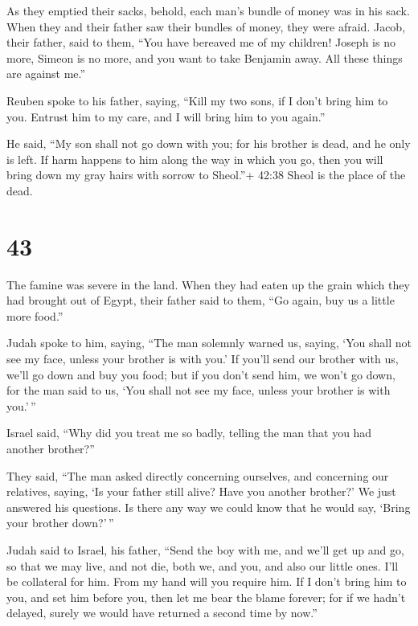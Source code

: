  As they emptied their sacks, behold, each man's bundle of
money was in his sack. When they and their father saw their bundles of
money, they were afraid.  Jacob, their father, said to
them, ``You have bereaved me of my children! Joseph is no more, Simeon
is no more, and you want to take Benjamin away. All these things are
against me.''

 Reuben spoke to his father, saying, ``Kill my two sons, if
I don't bring him to you. Entrust him to my care, and I will bring him
to you again.''

 He said, ``My son shall not go down with you; for his
brother is dead, and he only is left. If harm happens to him along the
way in which you go, then you will bring down my gray hairs with sorrow
to Sheol.''+ 42:38 Sheol is the place of the dead.

\hypertarget{section-42}{%
\section{43}\label{section-42}}

 The famine was severe in the land.  When they
had eaten up the grain which they had brought out of Egypt, their father
said to them, ``Go again, buy us a little more food.''

 Judah spoke to him, saying, ``The man solemnly warned us,
saying, `You shall not see my face, unless your brother is with you.'
 If you'll send our brother with us, we'll go down and buy
you food;  but if you don't send him, we won't go down, for
the man said to us, `You shall not see my face, unless your brother is
with you.'\,''

 Israel said, ``Why did you treat me so badly, telling the
man that you had another brother?''

 They said, ``The man asked directly concerning ourselves,
and concerning our relatives, saying, `Is your father still alive? Have
you another brother?' We just answered his questions. Is there any way
we could know that he would say, `Bring your brother down?'\,''

 Judah said to Israel, his father, ``Send the boy with me,
and we'll get up and go, so that we may live, and not die, both we, and
you, and also our little ones.  I'll be collateral for him.
From my hand will you require him. If I don't bring him to you, and set
him before you, then let me bear the blame forever;  for if
we hadn't delayed, surely we would have returned a second time by now.''

